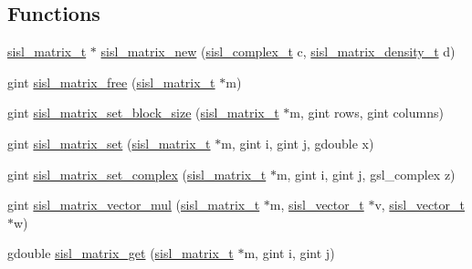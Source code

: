 \subsection*{Functions}
\begin{DoxyCompactItemize}
\item 
\mbox{\hyperlink{group__matrix_gad147923587b355644defb9bfbf981740}{sisl\+\_\+matrix\+\_\+t}} $\ast$ \mbox{\hyperlink{group__matrix_ga29ab0c52a1e38fc785031c5e93e4ca98}{sisl\+\_\+matrix\+\_\+new}} (\mbox{\hyperlink{group__vector_gadbf341f8965fc86dda28912ab5f04930}{sisl\+\_\+complex\+\_\+t}} c, \mbox{\hyperlink{group__matrix_gae50d4f05ed96de495bdd326c201c28ff}{sisl\+\_\+matrix\+\_\+density\+\_\+t}} d)
\item 
gint \mbox{\hyperlink{group__matrix_ga35de2cf4acfbe6e820f895a2ace8b328}{sisl\+\_\+matrix\+\_\+free}} (\mbox{\hyperlink{group__matrix_gad147923587b355644defb9bfbf981740}{sisl\+\_\+matrix\+\_\+t}} $\ast$m)
\item 
gint \mbox{\hyperlink{group__matrix_ga4dbf57c7f1ff8a417425b978b85ceefc}{sisl\+\_\+matrix\+\_\+set\+\_\+block\+\_\+size}} (\mbox{\hyperlink{group__matrix_gad147923587b355644defb9bfbf981740}{sisl\+\_\+matrix\+\_\+t}} $\ast$m, gint rows, gint columns)
\item 
gint \mbox{\hyperlink{group__matrix_ga67a577100e392546e9b3833415c739fd}{sisl\+\_\+matrix\+\_\+set}} (\mbox{\hyperlink{group__matrix_gad147923587b355644defb9bfbf981740}{sisl\+\_\+matrix\+\_\+t}} $\ast$m, gint i, gint j, gdouble x)
\item 
gint \mbox{\hyperlink{group__matrix_ga13808fa06a8b9d648152ae25ef7996d7}{sisl\+\_\+matrix\+\_\+set\+\_\+complex}} (\mbox{\hyperlink{group__matrix_gad147923587b355644defb9bfbf981740}{sisl\+\_\+matrix\+\_\+t}} $\ast$m, gint i, gint j, gsl\+\_\+complex z)
\item 
gint \mbox{\hyperlink{group__matrix_ga56825a47cadc80aa00795feedeb002bc}{sisl\+\_\+matrix\+\_\+vector\+\_\+mul}} (\mbox{\hyperlink{group__matrix_gad147923587b355644defb9bfbf981740}{sisl\+\_\+matrix\+\_\+t}} $\ast$m, \mbox{\hyperlink{group__vector_gacbac585492f5005f05f0c0b8463039be}{sisl\+\_\+vector\+\_\+t}} $\ast$v, \mbox{\hyperlink{group__vector_gacbac585492f5005f05f0c0b8463039be}{sisl\+\_\+vector\+\_\+t}} $\ast$w)
\item 
gdouble \mbox{\hyperlink{group__matrix_ga441d1109b3297e94b7c4fba2b618ea0c}{sisl\+\_\+matrix\+\_\+get}} (\mbox{\hyperlink{group__matrix_gad147923587b355644defb9bfbf981740}{sisl\+\_\+matrix\+\_\+t}} $\ast$m, gint i, gint j)
\item 

\end{DoxyCompactItemize}
